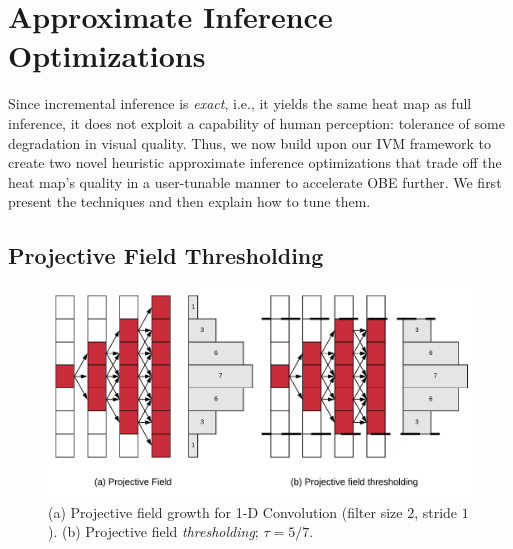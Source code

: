 \vspace{-2mm}
\section{Approximate Inference Optimizations}\label{sec:approx}
Since incremental inference is \textit{exact}, i.e., it yields the same heat map as full inference, it does not exploit a capability of human perception: tolerance of some degradation in visual quality. Thus, we now build upon our IVM framework to create two novel heuristic approximate inference optimizations that trade off the heat map's quality in a user-tunable manner to accelerate OBE further. 
We first present the techniques and then explain how to tune them.

\subsection{Projective Field Thresholding}

\begin{figure}[t]
\includegraphics[width=\columnwidth]{images/pf_truncate}
\vspace{-8mm}
\caption{(a) Projective field growth for 1-D Convolution (filter size $2$, stride $1$). (b) Projective field \textit{thresholding}; $\tau = 5/7$.}
\label{fig:pf_truncate}
\vspace{-2mm}
\end{figure}


